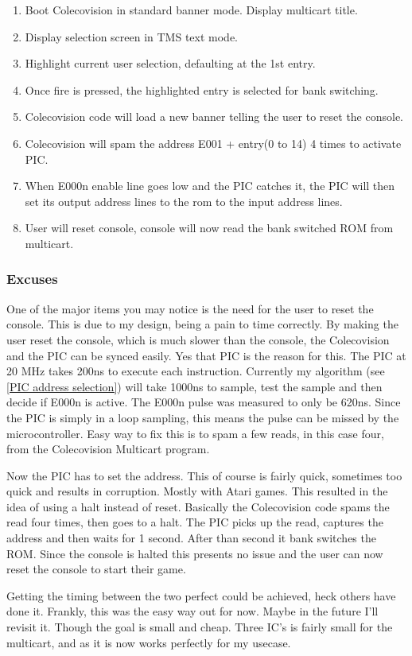 \documentclass{article}
\begin{document}
  \begin{enumerate}
    \item Boot Colecovision in standard banner mode. Display multicart title.
    \item Display selection screen in TMS text mode.
    \item Highlight current user selection, defaulting at the 1st entry.
    \item Once fire is pressed, the highlighted entry is selected for bank switching.
    \item Colecovision code will load a new banner telling the user to reset the console.
    \item Colecovision will spam the address E001 + entry(0 to 14) 4 times to activate PIC.
    \item When E000n enable line goes low and the PIC catches it, the PIC will then set its output address lines to the rom to the input address lines.
    \item User will reset console, console will now read the bank switched ROM from multicart.
  \end{enumerate}

  \subsubsection{Excuses} \label{Excuses}

  \par
  One of the major items you may notice is the need for the user to reset the console. This is due to my design, being a pain to time correctly.
  By making the user reset the console, which is much slower than the console, the Colecovision and the PIC can be synced easily. Yes that PIC is the reason for this.
  The PIC at 20 MHz takes 200ns to execute each instruction. Currently my algorithm (see \ref{PIC address selection}) will take 1000ns to sample, test the sample and then
  decide if E000n is active. The E000n pulse was measured to only be 620ns. Since the PIC is simply in a loop sampling, this means the pulse can be missed by the
  microcontroller. Easy way to fix this is to spam a few reads, in this case four, from the Colecovision Multicart program.
  \par
  Now the PIC has to set the address. This of course is fairly quick, sometimes too quick and results in corruption. Mostly with Atari games. This resulted in the idea
  of using a halt instead of reset. Basically the Colecovision code spams the read four times, then goes to a halt. The PIC picks up the read, captures the address and
  then waits for 1 second. After than second it bank switches the ROM. Since the console is halted this presents no issue and the user can now reset the console to
  start their game.
  \par
  Getting the timing between the two perfect could be achieved, heck others have done it. Frankly, this was the easy way out for now. Maybe in the future I'll revisit it.
  Though the goal is small and cheap. Three IC's is fairly small for the multicart, and as it is now works perfectly for my usecase.
\end{document}
